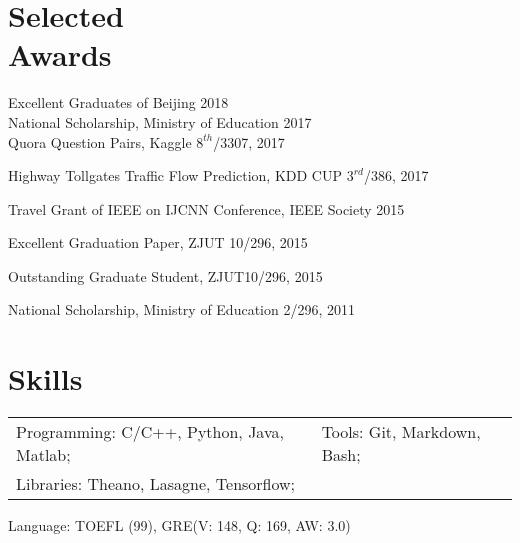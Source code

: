\documentclass[margin,line]{resume}
\begin{document}
\begin{resume}
%




\section{Selected \\ Awards}
Excellent Graduates of Beijing \hfill {2018} \\
National Scholarship, Ministry of Education \hfill {2017}\\
Quora Question Pairs, Kaggle \hfill {$8^{th}$/3307, 2017}

Highway Tollgates Traffic Flow Prediction, KDD CUP  \hfill {$3^{rd}$/386, 2017}

Travel Grant of IEEE on IJCNN Conference, IEEE Society \hfill { 2015}

Excellent Graduation Paper, ZJUT \hfill {10/296, 2015}

Outstanding Graduate Student, ZJUT\hfill {10/296, 2015}


National Scholarship, Ministry of Education \hfill {2/296, 2011}



%
%
%

\section{ Skills}
\begin{tabular}{@{}p{3.2in}p{4in}}
Programming: C/C++, Python, Java, Matlab;& Tools: Git, Markdown, Bash; \\
Libraries: Theano, Lasagne, Tensorflow;  & \\
\end{tabular}
Language: TOEFL (99), GRE(V: 148, Q: 169, AW: 3.0)


\end{resume}
\end{document}
